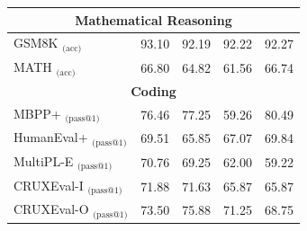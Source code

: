 \documentclass{article}
\begin{document}
\begin{table}[htbp]
{\begin{tabular}{l|c|ccc}
        \midrule
        \multicolumn{5}{c}{\textbf{Mathematical Reasoning}} \\
        \midrule

        GSM8K $_{\text{(acc)}}$ & 93.10  & 92.19 & 92.22 & 92.27 \\
        MATH $_{\text{(acc)}}$ &  66.80 & 64.82 & 61.56 & 66.74 \\
        \midrule
        \multicolumn{5}{c}{\textbf{Coding}} \\
        \midrule
        MBPP+ $_{\text{(pass@1)}}$ & 76.46  & 77.25 & 59.26 & 80.49 \\
        HumanEval+ $_{\text{(pass@1)}}$ & 69.51  & 65.85  & 67.07  & 69.84 \\
        MultiPL-E $_{\text{(pass@1)}}$ & 70.76  & 69.25 & 62.00  & 59.22 \\
        CRUXEval-I $_{\text{(pass@1)}}$ & 71.88  & 71.63 & 65.87 & 65.87 \\
        CRUXEval-O $_{\text{(pass@1)}}$ & 73.50  & 75.88 & 71.25 & 68.75 \\
        \bottomrule
    \end{tabular}
    }
    \label{tab:text_eval_base}
\end{table}
\end{document}
